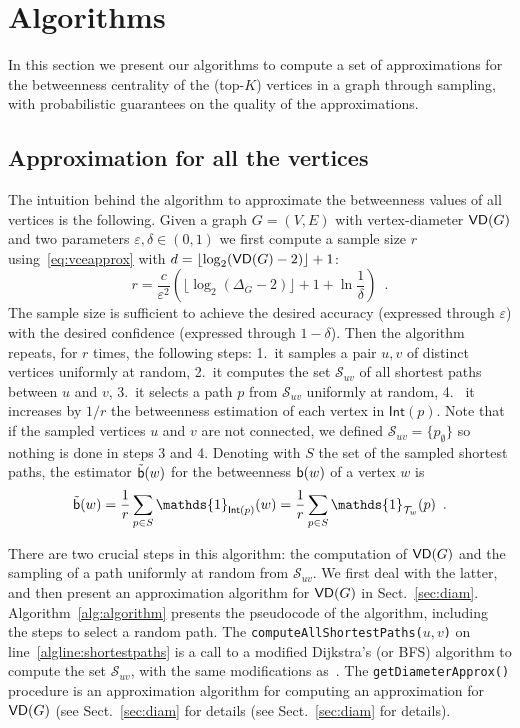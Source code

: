 \section{Algorithms}\label{sec:algo}
In this section we present our algorithms to compute a set of approximations for the
betweenness centrality of the (top-$K$) vertices in a graph through sampling,
with probabilistic guarantees on the quality of the approximations.

\subsection{Approximation for all the vertices}\label{sec:allvertapprox}
The intuition behind the algorithm to approximate the betweenness values of all
vertices is the following. Given a graph $G=(V,E)$
with vertex-diameter $\mathsf{VD}(G)$ and two parameters $\varepsilon,\delta\in(0,1)$
we first compute a sample size $r$ using~\eqref{eq:vceapprox} with
$d=\lfloor\log_2(\mathsf{VD}(G)-2)\rfloor+1$:
\begin{equation}\label{eq:samplesize}
r=\frac{c}{\varepsilon^2}\left(\lfloor\log_2(\Delta_G-2)\rfloor+1+\ln\frac{1}{\delta}\right)\enspace.
\end{equation}
The sample size is sufficient to achieve the desired accuracy
(expressed through $\varepsilon$) with the desired confidence (expressed through
$1-\delta$). Then the algorithm repeats, for $r$ times, the following steps:
1.~it samples a pair $u,v$ of distinct vertices uniformly at random, 2.~it
computes the set $\mathcal{S}_{uv}$ of all shortest paths between $u$ and $v$,
3.~it selects a path $p$ from $\mathcal{S}_{uv}$ uniformly at random, 4.~ it
increases by $1/r$ the betweenness estimation of each vertex in
$\mathsf{Int}(p)$. Note that if the sampled vertices $u$ and $v$ are not
connected, we defined $\mathcal{S}_{uv}=\{p_\emptyset\}$ so nothing is done in
steps 3 and 4. Denoting with $S$ the set of the sampled shortest paths, the
estimator $\tilde{\mathsf{b}}(w)$ for the betweenness $\mathsf{b}(w)$ of a vertex $w$
is 
\[
\tilde\betw(w) = \frac{1}{r}\sum_{p\in S}
\mathds{1}_{\mathsf{Int}(p)}(w) = \frac{1}{r}\sum_{p\in S}
\mathds{1}_{\mathcal{T}_w}(p)\enspace.
\]

There are two crucial steps in this algorithm: the computation of $\mathsf{VD}(G)$ and
the sampling of a path uniformly at random from $\mathcal{S}_{uv}$. We first
deal with the latter, and then present an approximation algorithm for $\mathsf{VD}(G)$
in Sect.~\ref{sec:diam}. Algorithm~\ref{alg:algorithm} presents the
pseudocode of the algorithm, including the steps to select a random path.
The \texttt{computeAllShortestPaths(}$u,v$\texttt{)}  on
line~\ref{algline:shortestpaths} is a call to a modified Dijkstra's (or BFS)
algorithm to compute the set $\mathcal{S}_{uv}$, with the same modifications
as~\citet{Brandes01}.
The \texttt{getDiameterApprox()} procedure is an approximation algorithm for
computing an approximation for $\mathsf{VD}(G)$ (see Sect.~\ref{sec:diam} for details
(see Sect.~\ref{sec:diam} for details).
